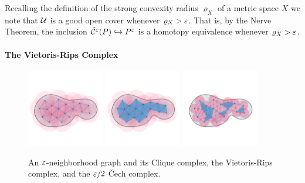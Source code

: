 Recalling the definition of the strong convexity radius $\varrho_X$ of a metric space $X$ we note that $\mathcal{U}$ is a good open cover whenever $\varrho_X > \varepsilon$.
That is, by the Nerve Theorem, the inclusion $\check{\mathcal{C}}^\varepsilon(P)\hookrightarrow P^\varepsilon$ is a homotopy equivalence whenever $\varrho_X > \varepsilon$.

\paragraph{The Vietoris-Rips Complex}

\begin{figure}[htbp]
  \centering
  \includegraphics[trim=0 300 0 500, clip, width=0.3\textwidth]{figures/rips/graph2_comp.pdf}
  \includegraphics[trim=0 300 0 500, clip, width=0.3\textwidth]{figures/rips/rips2_comp.pdf}
  \includegraphics[trim=0 300 0 500, clip, width=0.3\textwidth]{figures/rips/cech_comp.pdf}
  \caption{An $\varepsilon$-neighborhood graph and its Clique complex, the Vietoris-Rips complex, and the $\varepsilon/2$ \v Cech complex.}\label{fig:rips}
\end{figure}

